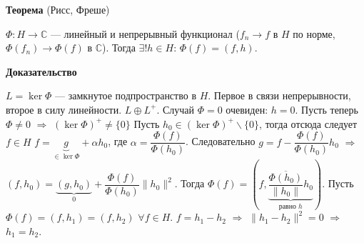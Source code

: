 \documentclass[12pt]{article}
\begin{document}
\textbf{Теорема} (Рисс, Фреше)

$\Phi:H \to \mathbb C$ --- линейный и непрерывный функционал ($f_n \to f$ в $H$ по норме, $\Phi(f_n) \to \Phi(f)$ в $\mathbb C$).
Тогда $\exists! h \in H$: $\Phi(f) = (f,h)$.

\textbf{Доказательство}

$L = \ker \Phi$ --- замкнутое подпространство в $H$.
Первое в связи непрерывности, второе в силу линейности.
$L \oplus L^+$.
Случай $\Phi = 0$ очевиден: $h = 0$.
Пусть теперь $\Phi \ne 0$ $\Rightarrow$ $(\ker\Phi)^+ \ne \{0\}$
Пусть $h_0 \in (\ker\Phi)^+\backslash\{0\}$, тогда отсюда следует $f \in H$ $f = \underbrace{g}_{\in \ker \Phi}+\alpha h_0$,
где $\alpha = \dfrac{\Phi(f)}{\Phi(h_0)}$.
Следовательно $g = f - \dfrac{\Phi(f)}{\Phi(h_0)}h_0$ $\Rightarrow$ $(f,h_0) = \underbrace{(g, h_0)}_{0} + \dfrac{\Phi(f)}{\Phi(h_0)}\|h_0\|^2$.
Тогда $\Phi(f) = (f, \underbrace{\dfrac{\overline{\Phi(h_0)}}{\|h_0\|}h_0}_{\text{равно }h})$.
Пусть $\Phi(f) = (f, h_1) = (f, h_2)$ $\forall f\in H$.
$f = h_1 - h_2$ $\Rightarrow$ $\|h_1 - h_2\|^2 = 0$ $\Rightarrow$ $h_1 = h_2$.
\end{document}
